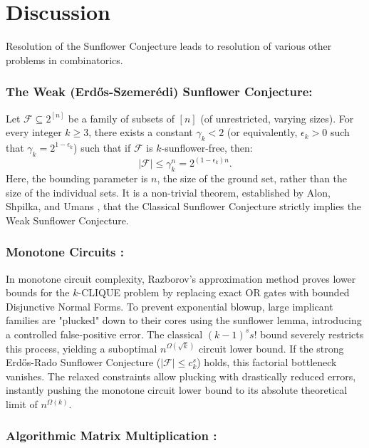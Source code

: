 \documentclass[runningheads,12pt,a4paper]{article}
\begin{document}
\section{Discussion}

Resolution of the Sunflower Conjecture leads to resolution of various other problems in combinatorics.

\subsubsection*{The Weak (Erdős-Szemerédi) Sunflower Conjecture:}Let $\mathcal{F} \subseteq 2^{[n]}$ be a family of subsets of $[n]$ (of unrestricted, varying sizes). For every integer $k \geq 3$, there exists a constant $\gamma_k < 2$ (or equivalently, $\epsilon_k > 0$ such that $\gamma_k = 2^{1-\epsilon_k}$) such that if $\mathcal{F}$ is $k$-sunflower-free, then:$$|\mathcal{F}| \leq \gamma_k^n = 2^{(1-\epsilon_k)n}.$$
Here, the bounding parameter is $n$, the size of the ground set, rather than the size of the individual sets. 
It is a non-trivial theorem, established by Alon, Shpilka, and Umans \cite{alon2012}, that the Classical Sunflower Conjecture strictly implies the Weak Sunflower Conjecture.


\subsubsection*{Monotone Circuits \cite{rao2023}:}

In monotone circuit complexity, Razborov’s approximation method proves lower bounds for the $k$-CLIQUE problem by replacing exact OR gates with bounded Disjunctive Normal Forms. To prevent exponential blowup, large implicant families are "plucked" down to their cores using the sunflower lemma, introducing a controlled false-positive error. The classical $(k-1)^s s!$ bound severely restricts this process, yielding a suboptimal $n^{\Omega(\sqrt{k})}$ circuit lower bound. If the strong Erdős-Rado Sunflower Conjecture ($|\mathcal{F}| \leq c_k^s$) holds, this factorial bottleneck vanishes. The relaxed constraints allow plucking with drastically reduced errors, instantly pushing the monotone circuit lower bound to its absolute theoretical limit of $n^{\Omega(k)}$.

\subsubsection*{ Algorithmic Matrix Multiplication \cite{rao2023}:}
\end{document}
